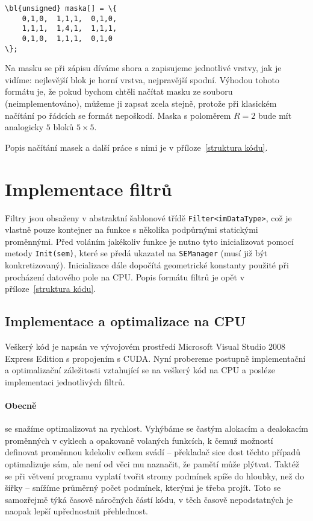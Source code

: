     \begin{Verbatim}[commandchars = \\\{\}]
\bl{unsigned} maska[] = \{
    0,1,0,  1,1,1,  0,1,0,
    1,1,1,  1,4,1,  1,1,1,
    0,1,0,  1,1,1,  0,1,0
\};
    \end{Verbatim}

    Na masku se při zápisu díváme shora a zapisujeme jednotlivé vrstvy, jak je vidíme: nejlevější blok je horní vrstva, nejpravější spodní. Výhodou tohoto formátu je, že pokud bychom chtěli načítat masku ze souboru (neimplementováno), můžeme ji zapsat zcela stejně, protože při klasickém načítání po řádcích se formát nepoškodí. Maska s poloměrem $R = 2$ bude mít analogicky $5$ bloků $5\times 5$.

    Popis načítání masek a další práce s nimi je v příloze~\ref{struktura kódu}.

    \section{Implementace filtrů}

    Filtry jsou obsaženy v abstraktní šablonové třídě {\tt Filter<imDataType>}, což je vlastně pouze kontejner na funkce s několika podpůrnými statickými proměnnými. Před voláním jakékoliv funkce je nutno tyto inicializovat pomocí metody {\tt Init(sem)}, které se předá ukazatel na {\tt SEManager} (musí již být konkretizovaný). Inicializace dále dopočítá geometrické konstanty použité při procházení datového pole na CPU. Popis formátu filtrů je opět v příloze~\ref{struktura kódu}.

    \subsection{Implementace a optimalizace na CPU}

         Veškerý kód je napsán ve vývojovém prostředí Microsoft Visual Studio 2008 Express Edition s propojením s CUDA. Nyní probereme postupně implementační a optimalizační záležitosti vztahující se na veškerý kód na CPU a posléze implementaci jednotlivých filtrů.

        \paragraph{Obecně} se snažíme optimalizovat na rychlost. Vyhýbáme se častým alokacím a dealokacím proměnných v cyklech a opakovaně volaných funkcích, k čemuž \Cpp možností definovat proměnnou kdekoliv celkem svádí -- překladač sice dost těchto případů optimalizuje sám, ale není od věci mu naznačit, že pamětí může plýtvat. Taktéž se při větvení programu vyplatí tvořit stromy podmínek spíše do hloubky, než do šířky -- snížíme průměrný počet podmínek, kterými je třeba projít. Toto se samozřejmě týká časově náročných částí kódu, v těch časově nepodstatných je naopak lepší upřednostnit přehlednost.

